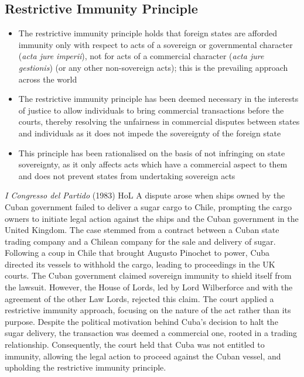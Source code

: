 \subsection{Restrictive Immunity Principle}
\begin{itemize}
    \item The restrictive immunity principle holds that foreign states are afforded immunity only with respect to acts of a sovereign or governmental character (\textit{acta jure imperii}), not for acts of a commercial character (\textit{acta jure gestionis}) (or any other non-sovereign acts); this is the prevailing approach across the world
    \item The restrictive immunity principle has been deemed necessary in the interests of justice to allow individuals to bring commercial transactions before the courts, thereby resolving the unfairness in commercial disputes between states and individuals as it does not impede the sovereignty of the foreign state
    \item This principle has been rationalised on the basis of not infringing on state sovereignty, as it only affects acts which have a commercial aspect to them and does not prevent states from undertaking sovereign acts
\end{itemize}

\begin{casedetails}{\textit{I Congresso del Partido} (1983) HoL}
    \flushleft
    A dispute arose when ships owned by the Cuban government failed to deliver a sugar cargo to Chile, prompting the cargo owners to initiate legal action against the ships and the Cuban government in the United Kingdom. The case stemmed from a contract between a Cuban state trading company and a Chilean company for the sale and delivery of sugar. Following a coup in Chile that brought Augusto Pinochet to power, Cuba directed its vessels to withhold the cargo, leading to proceedings in the UK courts. The Cuban government claimed sovereign immunity to shield itself from the lawsuit. However, the House of Lords, led by Lord Wilberforce and with the agreement of the other Law Lords, rejected this claim. The court applied a restrictive immunity approach, focusing on the nature of the act rather than its purpose. Despite the political motivation behind Cuba's decision to halt the sugar delivery, the transaction was deemed a commercial one, rooted in a trading relationship. Consequently, the court held that Cuba was not entitled to immunity, allowing the legal action to proceed against the Cuban vessel, and upholding the restrictive immunity principle.
\end{casedetails}

